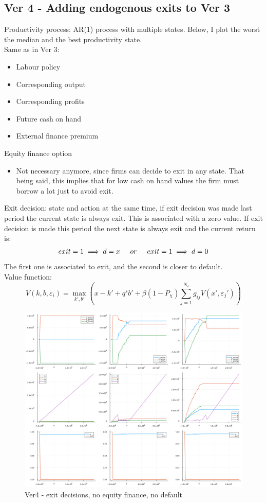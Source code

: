 \documentclass[12pt]{article}
\begin{document}
\subsection{Ver 4 - Adding endogenous exits to Ver 3}
Productivity process: AR(1) process with multiple states. Below, I plot the worst the median and the best productivity state. \vspace{3mm} \\
Same as in Ver 3: 
\begin{itemize}     \setlength\itemsep{0em}
    \item Labour policy
    \item Corresponding output
    \item Corresponding profits
    \item Future cash on hand
    \item External finance premium
\end{itemize}
Equity finance option
\begin{itemize}
    \item Not necessary anymore, since firms can decide to exit in any state. That being said, this implies that for low cash on hand values the firm must borrow a lot just to avoid exit. 
\end{itemize}
Exit decision: state and action at the same time, if exit decision was made last period the current state is always exit. This is associated with a zero value. If exit decision is made this period the next state is always exit and the current return is: 
\begin{equation}
    exit = 1 \implies d = x \newline \hspace{5mm} or \hspace{5mm}
    exit = 1 \implies d = 0 
\end{equation}
The first one is associated to exit, and the second is closer to default. \vspace{3mm} \\
Value function:
\begin{equation}
     V(k,b, \varepsilon_i) = \max_{k',b'}  \left( x - k' +  q^s b' +
            \beta (1-P_\chi) \sum_{j=1}^{N_\varepsilon} g_{ij}  V(x',\varepsilon_j') \right)
\end{equation}

\begin{figure}[H]  %
    \centering
    \caption{Ver4 - exit decisions, no equity finance, no default} \label{chart:CFLcdf}
    \includegraphics[width=1\textwidth]{ver4.png}
\end{figure}
\end{document}
